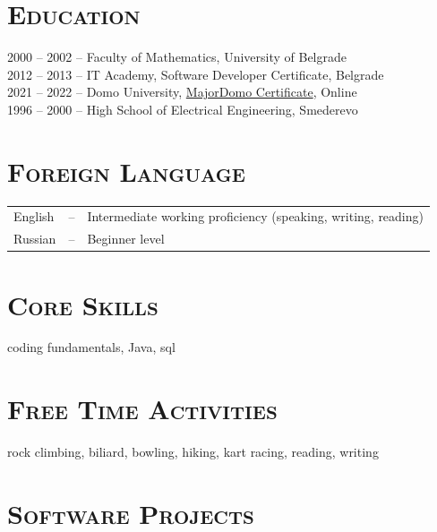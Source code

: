 \documentclass[12pt]{article}
\begin{document}
\section{\textsc{Education}}

2000 -- 2002 -- Faculty of Mathematics, University of Belgrade \\
2012 -- 2013 -- IT Academy, Software Developer Certificate, Belgrade \\
2021 -- 2022 -- Domo University, \href{https://drive.google.com/file/d/1i-GzyE43WospitxXdFWp2bRYe6wqZG48/view?usp=sharing}{MajorDomo Certificate}, Online \\
1996 -- 2000 -- High School of Electrical Engineering, Smederevo

\section{\textsc{Foreign Language}} 

\begin{tabular}{l c l}
    English &--& Intermediate working proficiency (speaking, writing, reading) \\
    Russian &--& Beginner level
\end{tabular}

\section{\textsc{Core Skills}}

coding fundamentals, Java, sql

\section{\textsc{Free Time Activities}}

rock climbing, biliard, bowling, hiking, kart racing, reading, writing

\pagebreak

\section{\textsc{Software Projects}}
\end{document}
